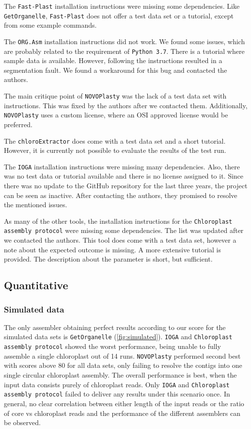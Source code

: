 \documentclass{bmcart}
\newcounter{todocounter}
\newcommand{\ak}[1]
{\stepcounter{todocounter}
 \todo[color=green!40,author=Arthur]{\thetodocounter: #1}
 }
\newcommand{\formatprogramnames}[1]{\texttt{#1}}
\newcommand{\ce}{\formatprogramnames{chloroExtractor}}
\newcommand{\oa}{\formatprogramnames{ORG.Asm}}
\newcommand{\fp}{\formatprogramnames{Fast-Plast}}
\newcommand{\ioga}{\formatprogramnames{IOGA}}
\newcommand{\np}{\formatprogramnames{NOVOPlasty}}
\newcommand{\go}{\formatprogramnames{GetOrganelle}}
\newcommand{\cassp}{\formatprogramnames{Chloroplast assembly protocol}}
\begin{document}
The \fp{} installation instructions were missing some dependencies. Like \go{}, \fp{} does not offer a test data set or a tutorial, except from some example commands. 

The \oa{} installation instructions did not work. We found some issues, which are probably related to the requirement of \texttt{Python~3.7}. There is a tutorial where sample data is available. However, following the instructions resulted in a segmentation fault. We found a workaround for this bug and contacted the authors.

The main critique point of \np{} was the lack of a test data set with instructions. This was fixed by the authors after we contacted them. Additionally, \np{} uses a custom license, where an OSI approved license would be preferred.

The \ce{} does come with a test data set and a short tutorial. However, it is currently not possible to evaluate the results of the test run.

The \ioga{} installation instructions were missing many dependencies. Also, there was no test data or tutorial available and there is no license assigned to it. Since there was no update to the GitHub repository for the last three years, the project can be seen as inactive. After contacting the authors, they promised to resolve the mentioned issues.

As many of the other tools, the installation instructions for the \cassp{} were missing some dependencies. The list was updated after we contacted the authors. This tool does come with a test data set, however a note about the expected outcome is missing. A more extensive tutorial is provided. The description about the parameter is short, but sufficient.

\subsection*{Quantitative}
\subsubsection*{Simulated data}
The only assembler obtaining perfect results according to our score for the simulated data sets is \go{} (\cref{fig:simulated}).
\ioga{} and \cassp{} showed the worst performance, being unable to fully assemble a single chloroplast out of \num{14} runs.
\np{} performed second best with scores above \num{80} for all data sets, only failing to resolve the contigs into one single circular chloroplast assembly.
The overall performance \ak{of all assemblers ?} is best, when the input data consists purely of chloroplast reads.
Only \ioga{} and \cassp{} failed to deliver any results under this scenario once.
In general, no clear correlation between either length of the input reads or the ratio of core vs chloroplast reads and the performance of the different assemblers can be observed. 
\end{document}
